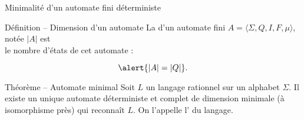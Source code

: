 
\begingroup

\begin{frame}{Minimalité d'un automate fini déterministe}
  \begin{block}{Définition -- Dimension d'un automate}
    La  d'un automate fini $A=\langle \Sigma, Q, I, F, \mu \rangle$,
    notée \alert{$|A|$} est \\ le nombre d'états de cet automate :

    $$\alert{|A| = |Q|}.$$
  \end{block}

  \begin{block}{Théorème -- Automate minimal}
    Soit $L$ un langage rationnel sur un alphabet $\Sigma$.
    Il existe \alert{un unique} automate déterministe et complet
    \alert{de dimension minimale} (à isomorphisme près) qui reconnaît $L$. 
    On l'appelle l’ du langage.
  \end{block}
\end{frame}

\endgroup
